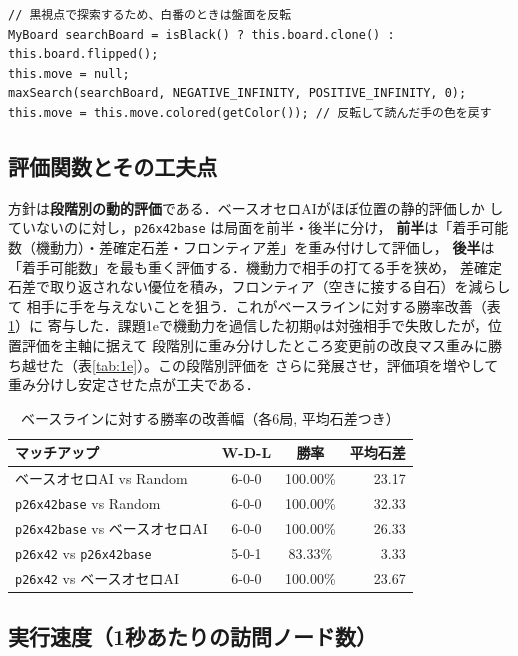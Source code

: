 \documentclass[11pt,a4j]{ujarticle} %
\begin{document}
\begin{lstlisting}[caption=黒視点固定のための盤面反転（OurPlayer\#think）,label=src:flip]
// 黒視点で探索するため、白番のときは盤面を反転
MyBoard searchBoard = isBlack() ? this.board.clone() : this.board.flipped();
this.move = null;
maxSearch(searchBoard, NEGATIVE_INFINITY, POSITIVE_INFINITY, 0);
this.move = this.move.colored(getColor()); // 反転して読んだ手の色を戻す
\end{lstlisting}

\subsection{評価関数とその工夫点}

方針は\textbf{段階別の動的評価}である．ベースオセロAIがほぼ位置の静的評価しか
していないのに対し，{\verb+p26x42base+} は局面を前半・後半に分け，
\textbf{前半}は「着手可能数（機動力）・差確定石差・フロンティア差」を重み付けして評価し，
\textbf{後半}は「着手可能数」を最も重く評価する．機動力で相手の打てる手を狭め，
差確定石差で取り返されない優位を積み，フロンティア（空きに接する自石）を減らして
相手に手を与えないことを狙う．これがベースラインに対する勝率改善（表\ref{tab:win}）に
寄与した．課題1eで機動力を過信した初期φは対強相手で失敗したが，位置評価を主軸に据えて
段階別に重み分けしたところ変更前の改良マス重みに勝ち越せた（表\ref{tab:1e}）。この段階別評価を
さらに発展させ，評価項を増やして重み分けし安定させた点が工夫である．

\begin{table}[h]\center
\caption{ベースラインに対する勝率の改善幅（各6局, 平均石差つき）}\label{tab:win}
\begin{tabular}{l|c|c|r}
マッチアップ & W-D-L & 勝率 & 平均石差 \\ \hline\hline
ベースオセロAI vs Random & 6-0-0 & 100.00\% & 23.17 \\
{\tt p26x42base} vs Random & 6-0-0 & 100.00\% & 32.33 \\
{\tt p26x42base} vs ベースオセロAI & 6-0-0 & 100.00\% & 26.33 \\
{\tt p26x42} vs {\tt p26x42base} & 5-0-1 & 83.33\% & 3.33 \\
{\tt p26x42} vs ベースオセロAI & 6-0-0 & 100.00\% & 23.67 \\
\end{tabular}
\end{table}

\subsection{実行速度（1秒あたりの訪問ノード数）}
\end{document}
